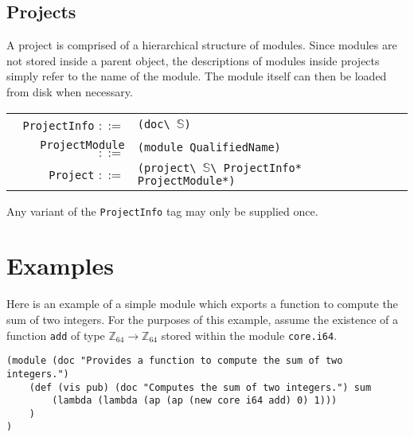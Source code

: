 \documentclass[UKenglish, 11pt, a4paper, parskip=half]{scrbook}
\newcommand{\code}[1]{\lstinline{#1}}
\theoremstyle{definition}
\begin{document}
\subsection{Projects}

A project is comprised of a hierarchical structure of modules.
Since modules are not stored inside a parent object, the descriptions of modules inside projects simply refer to the name of the module.
The module itself can then be loaded from disk when necessary.

\begin{tabular}{r l p{7cm}}
    \code{ProjectInfo} \( ::= \) & \code{(doc\ }\( \mathbb S \)\code{)} \\
    \code{ProjectModule} \( ::= \) & \code{(module QualifiedName)} \\
    \code{Project} \( ::= \) & \code{(project\ }\( \mathbb S \)\code{\ ProjectInfo* ProjectModule*)} \\
\end{tabular}

Any variant of the \code{ProjectInfo} tag may only be supplied once.

\section{Examples}
Here is an example of a simple module which exports a function to compute the sum of two integers.
For the purposes of this example, assume the existence of a function \code{add} of type \( \mathbb Z_{64} \to \mathbb Z_{64} \) stored within the module \code{core.i64}.
\begin{lstlisting}
(module (doc "Provides a function to compute the sum of two integers.")
    (def (vis pub) (doc "Computes the sum of two integers.") sum
        (lambda (lambda (ap (ap (new core i64 add) 0) 1)))
    )
)
\end{lstlisting}

\backmatter

\printbibliography
\end{document}
